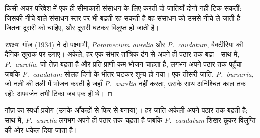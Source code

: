 \begin{proposition}[स्पर्धी अपवर्जन]\label{prop:b1:species-interactions:gause}
किसी अचर परिवेश में एक ही सीमाकारी संसाधन के लिए  करती दो जातियाँ
दोनों नहीं टिक सकतीं: जिसकी  नीचे वाले संसाधन-स्तर पर भी बढ़ती रह
सकती है वह संसाधन को उससे नीचे ले जाती है जितना दूसरी को चाहिए, और
दूसरी घटकर विलुप्त हो जाती है।
\end{proposition}
\begin{proof}[साक्ष्य]
गॉज़ (1934) ने दो पक्ष्माभी, \emph{Paramecium aurelia} और
\emph{P.~caudatum}, बैक्टीरिया की दैनिक खुराक पर उगाए। अकेले, हर एक
संभार-तांत्रिक ढंग से अपने ही पठार तक बढ़ा। साथ में, \emph{P.~aurelia},
जो तेज़ बढ़ता है और प्रति प्राणी कम भोजन चाहता है, लगभग अपने पठार तक
पहुँचा जबकि \emph{P.~caudatum} सोलह दिनों के भीतर घटकर शून्य हो गया। एक
तीसरी जाति, \emph{P.~bursaria}, जो नली की तली में भोजन करती है जहाँ
\emph{P.~aurelia} नहीं करता, उसके साथ अनिश्चित काल तक रही: अपवर्जन तभी
टिका जब  एक ही थे।
\end{proof}

\begin{omfigure}

{\small गॉज़ का स्पर्धा-प्रयोग (उनके आँकड़ों से फिर से बनाया)।
हर जाति अकेली अपने पठार तक बढ़ती है; साथ में, \emph{P.~aurelia} लगभग
अपने ही पठार तक चढ़ता है जबकि \emph{P.~caudatum} शिखर छूकर विलुप्ति की
ओर धकेल दिया जाता है।}
\end{omfigure}

